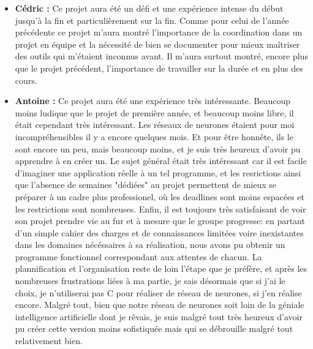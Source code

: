 \documentclass[12pt]{report}
\begin{document}
\newpage

\begin{itemize}
	\item \textbf{Cédric :} Ce projet aura été un défi et une expérience intense du début jusqu'à la fin et particulièrement sur la fin. Comme pour celui de l'année précédente ce projet m'aura montré l'importance de la coordination dans un projet en équipe et la nécessité de bien se documenter pour mieux maîtriser des outils qui m'étaient inconnus avant. Il m'aura surtout montré, encore plus que le projet précédent, l'importance de travailler sur la durée et en plus des cours.
\end{itemize}
\begin{itemize}
	\item \textbf{Antoine :} Ce projet aura été une expérience très intéressante. Beaucoup moins ludique que le projet de première année, et beaucoup moins libre, il était cependant très intéressant. Les réseaux de neurones étaient pour moi incompréhensibles il y a encore quelques mois. Et pour être honnête, ils le sont encore un peu, mais beaucoup moins, et je suis très heureux d'avoir pu apprendre à en créer un. Le sujet général était très intéressant car il est facile d'imaginer une application réelle à un tel programme, et les resrictions ainsi que l'absence de semaines "dédiées" au projet permettent de mieux se préparer à un cadre plus professionel, où les deadlines sont moins espacées et les restrictions sont nombreuses. Enfin, il est toujours très satisfaisant de voir son projet prendre vie au fur et à mesure que le groupe progresse: en partant d'un simple cahier des charges et de connaissances limitées voire inexistantes dans les domaines nécéssaires à sa réalisation, nous avons pu obtenir un programme fonctionnel correspondant aux attentes de chacun. La plannification et l'organisation reste de loin l'étape que je préfère, et après les nombreuses frustrations liées à ma partie, je sais désormais que si j'ai le choix, je n'utiliserai pas C pour réaliser de réseau de neurones, si j'en réalise encore. Malgré tout, bien que notre réseau de neurones soit loin de la géniale intelligence artificielle dont je rêvais, je suis malgré tout très heureux d'avoir pu créer cette version moins sofistiquée mais qui se débrouille malgré tout relativement bien.

\end{itemize}
\end{document}
